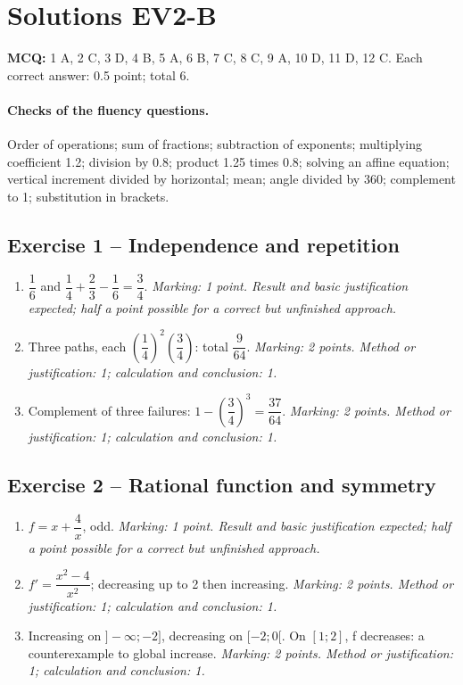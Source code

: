 \mxnewpage\section*{Solutions EV2-B}\label{EV2-B-CORR}
\textbf{MCQ:} 1 A, 2 C, 3 D, 4 B, 5 A, 6 B, 7 C, 8 C, 9 A, 10 D, 11 D, 12 C. Each correct answer: 0.5 point; total 6.
\paragraph{Checks of the fluency questions.} Order of operations; sum of fractions; subtraction of exponents; multiplying coefficient 1.2; division by 0.8; product 1.25 times 0.8; solving an affine equation; vertical increment divided by horizontal; mean; angle divided by 360; complement to 1; substitution in brackets.
\subsection*{Exercise 1 -- Independence and repetition}
\begin{enumerate}
\item $\dfrac{1}{6}$ and $\dfrac{1}{4}+\dfrac{2}{3}-\dfrac{1}{6}=\dfrac{3}{4}$. \textit{Marking: 1 point. Result and basic justification expected; half a point possible for a correct but unfinished approach.}
\item Three paths, each $(\dfrac{1}{4})^2(\dfrac{3}{4})$: total $\dfrac{9}{64}$. \textit{Marking: 2 points. Method or justification: 1; calculation and conclusion: 1.}
\item Complement of three failures: $1-(\dfrac{3}{4})^3=\dfrac{37}{64}$. \textit{Marking: 2 points. Method or justification: 1; calculation and conclusion: 1.}
\end{enumerate}
\subsection*{Exercise 2 -- Rational function and symmetry}
\begin{enumerate}
\item $f=x+\dfrac{4}{x}$, odd. \textit{Marking: 1 point. Result and basic justification expected; half a point possible for a correct but unfinished approach.}
\item $f\prime =\dfrac{x^2-4}{x^2}$; decreasing up to 2 then increasing. \textit{Marking: 2 points. Method or justification: 1; calculation and conclusion: 1.}
\item Increasing on $]-\infty;-2]$, decreasing on $[-2;0[$. On $[1;2]$, f decreases: a counterexample to global increase. \textit{Marking: 2 points. Method or justification: 1; calculation and conclusion: 1.}
\end{enumerate}
